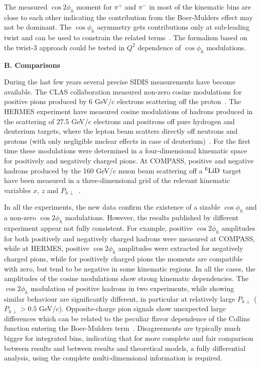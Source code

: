 \documentclass[aps,prl,twocolumn,showpacs,superscriptaddress,groupedaddress]{revtex4-1}  %
\newcommand{\Phperp}{P_{h\perp}}
\begin{document}
The measured $\cos 2 \phi_h$ moment for $\pi^+$ and $\pi^-$ in most of the kinematic bins are close to each other indicating the contribution from the Boer-Mulders effect may not be dominant.
The $\cos \phi_h$ asymmetry gets contributions only at sub-leading twist and can be used to constrain the related terms~\cite{Cahn:1978se,Anselmino:2005nn,Berger:1979xz}.
The formalism based on the twist-3 approach could be tested in $Q^2$ dependence of $\cos\phi_h$ modulations.

\begin{center}
\textbf{B. Comparisons} \par
\end{center}

During the last few years several precise SIDIS measurements have become available. The CLAS
collaboration measured non-zero cosine modulations for positive pions produced
by 6 GeV/c electrons scattering off the proton~\cite{Osipenko:2008rv}.  The
HERMES experiment have measured cosine modulations of hadrons produced in the
scattering of 27.5 GeV/c electrons and positrons off pure hydrogen and deuterium
targets, where the lepton beam scatters directly off neutrons and protons (with
only negligible nuclear effects in case of
deuterium)~\cite{Airapetian:2012yg}. For the first time these modulations were
determined in a four-dimensional kinematic space for positively and negatively
charged pions.
At COMPASS, positive and negative hadrons produced by the 160 GeV/c muon beam
scattering off a $\rm ^6LiD$ target have been measured in a three-dimensional
grid of the relevant kinematic variables $x$, $z$ and
$\Phperp$~\cite{Adolph:2014pwc}.

In all the experiments, the new data confirm the existence of a sizable
$\cos\phi_h$ and a non-zero $\cos2\phi_h$ modulations.  However, the results
published by different experiment appear not fully consistent. For example,
positive $\cos2\phi_h$ amplitudes for both positively and negatively charged
hadrons were measured at COMPASS, while at HERMES, positive $\cos 2\phi_h$ amplitudes
were extracted for negatively charged pions, while for positively charged pions
the moments are compatible with zero, but tend to be negative in some kinematic
regions. In all the cases, the amplitudes of the cosine modulations show strong
kinematic dependencies. 
The $\cos2\phi_h$ modulation of positive hadrons in two experiments, while showing similar behaviour are significantly different, in particular at relatively large $\Phperp$  ($\Phperp>0.5$ GeV$/c$).
Opposite-charge pion signals show unexpected large differences which can be related to the peculiar flavor dependence of the Collins function entering the Boer-Mulders term~\cite{Airapetian:2012yg}. Disagreements are typically much bigger for integrated bins, indicating that for 
more complete and fair comparison between results and between results
and theoretical models, a fully differential analysis, using the complete
multi-dimensional information is required.
\end{document}
